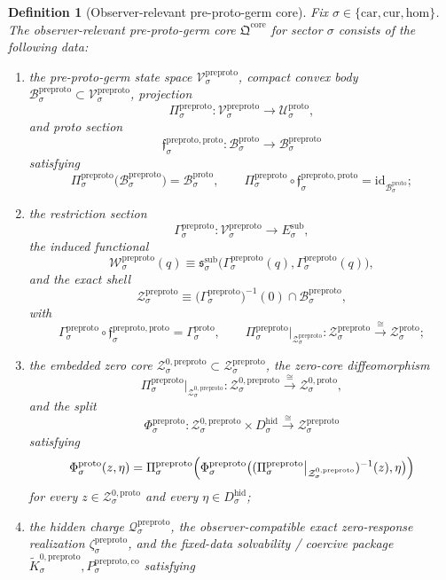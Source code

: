 \documentclass[11pt]{article}
\newcommand{\Car}{\mathrm{car}}
\newcommand{\Cur}{\mathrm{cur}}
\newcommand{\Hom}{\mathrm{hom}}
\newcommand{\SubTarget}[1]{E_{#1}^{\mathrm{sub}}}
\newcommand{\SubPair}[1]{\mathfrak s_{#1}^{\mathrm{sub}}}
\newcommand{\HiddenBody}[1]{D_{#1}^{\mathrm{hid}}}
\newcommand{\ProtoSpace}[1]{\mathcal U_{#1}^{\mathrm{proto}}}
\newcommand{\ProtoBody}[1]{\mathcal B_{#1}^{\mathrm{proto}}}
\newcommand{\ProtoSection}[1]{\Gamma_{#1}^{\mathrm{proto}}}
\newcommand{\ProtoShellSet}[1]{\mathcal Z_{#1}^{\mathrm{proto}}}
\newcommand{\ProtoZeroCore}[1]{\mathcal Z_{#1}^{0,\mathrm{proto}}}
\newcommand{\ProtoSplit}[1]{\Phi_{#1}^{\mathrm{proto}}}
\newcommand{\PreProtoCore}{\mathfrak Q^{\mathrm{core}}}
\newcommand{\PreProtoSpace}[1]{\mathcal V_{#1}^{\mathrm{preproto}}}
\newcommand{\PreProtoBody}[1]{\mathcal B_{#1}^{\mathrm{preproto}}}
\newcommand{\PreProtoProj}[1]{\Pi_{#1}^{\mathrm{preproto}}}
\newcommand{\PreProtoProtoMin}[1]{\mathfrak f_{#1}^{\mathrm{preproto,proto}}}
\newcommand{\PreProtoSection}[1]{\Gamma_{#1}^{\mathrm{preproto}}}
\newcommand{\PreProtoFunctional}[1]{\mathscr W_{#1}^{\mathrm{preproto}}}
\newcommand{\PreProtoShellSet}[1]{\mathcal Z_{#1}^{\mathrm{preproto}}}
\newcommand{\PreProtoZeroCore}[1]{\mathcal Z_{#1}^{0,\mathrm{preproto}}}
\newcommand{\PreProtoSplit}[1]{\Phi_{#1}^{\mathrm{preproto}}}
\newcommand{\PreProtoCharge}[1]{\mathcal Q_{#1}^{\mathrm{preproto}}}
\newcommand{\PreProtoEmbed}[1]{\zeta_{#1}^{\mathrm{preproto}}}
\newcommand{\PreProtoKernelCh}[1]{\widetilde K_{#1}^{0,\mathrm{preproto}}}
\newcommand{\PreProtoStateComp}[1]{P_{#1}^{\mathrm{preproto,co}}}
\newtheorem{definition}{Definition}
\begin{document}
\begin{definition}[Observer-relevant pre-proto-germ core]
\label{def:core}
Fix \(\sigma\in\{\Car,\Cur,\Hom\}\). The \emph{observer-relevant pre-proto-germ core} \(\PreProtoCore\) for sector \(\sigma\) consists of the following data:
\begin{enumerate}
    \item the pre-proto-germ state space \(\PreProtoSpace{\sigma}\), compact convex body \(\PreProtoBody{\sigma}\subset\PreProtoSpace{\sigma}\), projection
    \[
    \PreProtoProj{\sigma}:\PreProtoSpace{\sigma}\to\ProtoSpace{\sigma},
    \]
    and proto section
    \[
    \PreProtoProtoMin{\sigma}:\ProtoBody{\sigma}\to\PreProtoBody{\sigma}
    \]
    satisfying
    \[
    \PreProtoProj{\sigma}\bigl(\PreProtoBody{\sigma}\bigr)=\ProtoBody{\sigma},
    \qquad
    \PreProtoProj{\sigma}\circ\PreProtoProtoMin{\sigma}
    =
    \mathrm{id}_{\ProtoBody{\sigma}};
    \]
    \item the restriction section
    \[
    \PreProtoSection{\sigma}:\PreProtoSpace{\sigma}\to\SubTarget{\sigma},
    \]
    the induced functional
    \[
    \PreProtoFunctional{\sigma}(q)
    \equiv
    \SubPair{\sigma}\bigl(\PreProtoSection{\sigma}(q),\PreProtoSection{\sigma}(q)\bigr),
    \]
    and the exact shell
    \[
    \PreProtoShellSet{\sigma}
    \equiv
    \bigl(\PreProtoSection{\sigma}\bigr)^{-1}(0)\cap\PreProtoBody{\sigma},
    \]
    with
    \[
    \PreProtoSection{\sigma}\circ\PreProtoProtoMin{\sigma}
    =
    \ProtoSection{\sigma},
    \qquad
    \PreProtoProj{\sigma}\big|_{\PreProtoShellSet{\sigma}}
    :
    \PreProtoShellSet{\sigma}
    \xrightarrow{\cong}
    \ProtoShellSet{\sigma};
    \]
    \item the embedded zero core \(\PreProtoZeroCore{\sigma}\subset\PreProtoShellSet{\sigma}\), the zero-core diffeomorphism
    \[
    \PreProtoProj{\sigma}\big|_{\PreProtoZeroCore{\sigma}}
    :
    \PreProtoZeroCore{\sigma}
    \xrightarrow{\cong}
    \ProtoZeroCore{\sigma},
    \]
    and the split
    \[
    \PreProtoSplit{\sigma}:
    \PreProtoZeroCore{\sigma}\times\HiddenBody{\sigma}
    \xrightarrow{\cong}
    \PreProtoShellSet{\sigma}
    \]
    satisfying
    \[
    \ProtoSplit{\sigma}(z,\eta)
    =
    \PreProtoProj{\sigma}\Bigl(
    \PreProtoSplit{\sigma}\bigl(
    (\PreProtoProj{\sigma}\big|_{\PreProtoZeroCore{\sigma}})^{-1}(z),\eta
    \bigr)\Bigr)
    \]
    for every \(z\in\ProtoZeroCore{\sigma}\) and every \(\eta\in\HiddenBody{\sigma}\);
    \item the hidden charge \(\PreProtoCharge{\sigma}\), the observer-compatible exact zero-response realization \(\PreProtoEmbed{\sigma}\), and the fixed-data solvability / coercive package \(\PreProtoKernelCh{\sigma},\PreProtoStateComp{\sigma}\) satisfying

\end{enumerate}
\end{definition}
\end{document}
